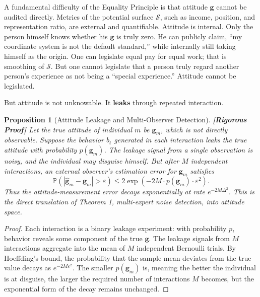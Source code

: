 \documentclass[12pt,a4paper]{article}
\newtheorem{proposition}[theorem]{Proposition}
\theoremstyle{remark}
\newcommand{\Pbb}{\mathbb{P}}
\newcommand{\rigorFull}{\textnormal{\textbf{[Rigorous Proof]}}}
\begin{document}
A fundamental difficulty of the Equality Principle is that attitude $\mathbf{g}$ cannot be audited directly. Metrics of the potential surface $\mathcal{S}$, such as income, position, and representation ratio, are external and quantifiable. Attitude is internal. Only the person himself knows whether his $\mathbf{g}$ is truly zero. He can publicly claim, ``my coordinate system is not the default standard,'' while internally still taking himself as the origin. One can legislate equal pay for equal work; that is smoothing of $\mathcal{S}$. But one cannot legislate that a person truly regard another person's experience as not being a ``special experience.'' Attitude cannot be legislated.

But attitude is not unknowable. It \textbf{leaks} through repeated interaction.

\begin{proposition}[Attitude Leakage and Multi-Observer Detection]\label{prop:attitude_leak}\rigorFull
Let the true attitude of individual $m$ be $\mathbf{g}_m$, which is not directly observable. Suppose the behavior $b_t$ generated in each interaction leaks the true attitude with probability $p(\mathbf{g}_m)$. The leakage signal from a single observation is noisy, and the individual may disguise himself. But after $M$ independent interactions, an external observer's estimation error for $\mathbf{g}_m$ satisfies
\begin{equation}
    \Pbb\left(|\hat{\mathbf{g}}_m - \mathbf{g}_m| > \varepsilon\right) \leq 2\exp\left(-2M \cdot p(\mathbf{g}_m) \cdot \varepsilon^2\right).
\end{equation}
Thus the attitude-measurement error decays exponentially at rate $e^{-2M\Delta^2}$. This is the direct translation of Theorem 1, multi-expert noise detection, into attitude space.
\end{proposition}

\begin{proof}
Each interaction is a binary leakage experiment: with probability $p$, behavior reveals some component of the true $\mathbf{g}$. The leakage signals from $M$ interactions aggregate into the mean of $M$ independent Bernoulli trials. By Hoeffding's bound, the probability that the sample mean deviates from the true value decays as $e^{-2M\varepsilon^2}$. The smaller $p(\mathbf{g}_m)$ is, meaning the better the individual is at disguise, the larger the required number of interactions $M$ becomes, but the exponential form of the decay remains unchanged.
\end{proof}
\end{document}
